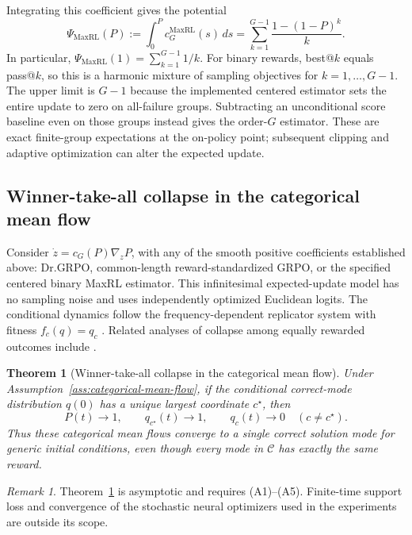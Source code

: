 \documentclass{article}
\newcommand{\enforcehalffinalproseline}{%
  \setlength{\parfillskip}{0pt plus .20\linewidth}}
\newcommand{\1}{\mathbf 1}
\newtheorem{theorem}[lemma]{Theorem}
\theoremstyle{remark}
\newtheorem{remark}[lemma]{Remark}
\theoremstyle{definition}
\theoremstyle{plain}
\begin{document}
Integrating this coefficient gives the potential
\begin{equation}
 \Psi_{\mathrm{MaxRL}}(P)
 :=\int_0^P c_G^{\mathrm{MaxRL}}(s)\,ds
 =\sum_{k=1}^{G-1}\frac{1-(1-P)^k}{k}.
 \label{eq:maxrl-potential-finite-sum}
\end{equation}
In particular, $\Psi_{\mathrm{MaxRL}}(1)=\sum_{k=1}^{G-1}1/k$.
For binary rewards, best@\(k\) equals pass@\(k\), so this is a harmonic
mixture of sampling objectives for $k=1,\ldots,G-1$. The upper limit is
$G-1$ because the implemented centered estimator sets the entire update
to zero on all-failure groups. Subtracting an unconditional score baseline
even on those groups instead gives the order-$G$ estimator. These are exact
finite-group expectations at the on-policy point; subsequent clipping and
adaptive optimization can alter the expected update.


\subsection{Winner-take-all collapse in the categorical mean flow}
\label{app:theory-collapse}

Consider $\dot z=c_G(P)\nabla_zP$, with any of the smooth positive
coefficients established above: Dr.GRPO, common-length reward-standardized
GRPO, or the specified centered binary MaxRL estimator. This infinitesimal
expected-update model has
no sampling noise and uses independently optimized Euclidean logits. The
conditional dynamics follow the frequency-dependent replicator system
with fitness $f_c(q)=q_c$
\citep{hofbauer1998evolutionary,harper2009informationgeometry}.
Related analyses of collapse among equally rewarded outcomes include
\citet{sinha2026expected,lochab2026ucpo}.

\begin{theorem}[Winner-take-all collapse in the categorical mean flow]
\enforcehalffinalproseline
\label{thm:grpo-collapse}
Under Assumption~\ref{ass:categorical-mean-flow}, if the conditional correct-mode
distribution $q(0)$ has a unique largest coordinate $c^\star$, then
\[
  P(t)\longrightarrow1,
  \qquad
  q_{c^\star}(t)\longrightarrow1,
  \qquad
  q_c(t)\longrightarrow0\quad(c\ne c^\star).
\]
Thus these categorical mean flows converge to a single correct solution
mode for generic initial conditions, even though every mode in $\mathcal C$
has exactly the same reward.
\end{theorem}

\begin{remark}
Theorem~\ref{thm:grpo-collapse} is asymptotic and requires (A1)--(A5).
Finite-time support loss and convergence of the stochastic neural optimizers
used in the experiments are outside its scope.
\end{remark}
\end{document}
